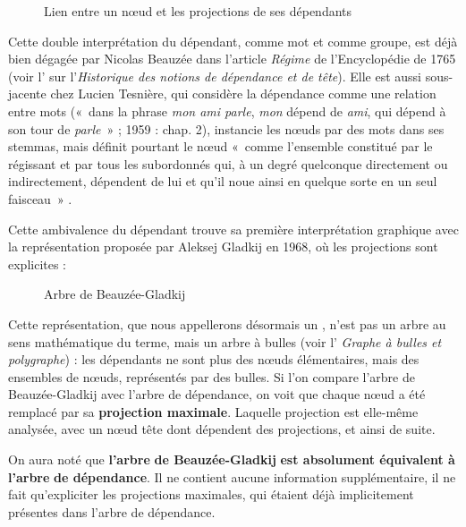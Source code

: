 \begin{figure}

\caption{\label{fig:}Lien entre un nœud et les projections de ses dépendants}

\end{figure}

Cette double interprétation du dépendant, comme mot et comme groupe, est déjà bien dégagée par Nicolas Beauzée dans l’article \textit{Régime} de l’Encyclopédie de 1765 (voir l’ sur l’\textit{Historique des notions de dépendance et de tête}). Elle est aussi sous-jacente chez Lucien Tesnière, qui considère la dépendance comme une relation entre mots («~dans la phrase \textit{mon ami parle}, \textit{mon} dépend de \textit{ami}, qui dépend à son tour de \textit{parle}~» ; 1959 : chap. 2), instancie les nœuds par des mots dans ses stemmas, mais définit pourtant le nœud «~comme l’ensemble constitué par le régissant et par tous les subordonnés qui, à un degré quelconque directement ou indirectement, dépendent de lui et qu’il noue ainsi en quelque sorte en un seul faisceau~» \citep[chap.3]{Tesnières1959}.

Cette ambivalence du dépendant trouve sa première interprétation graphique avec la représentation proposée par Aleksej Gladkij en 1968, où les projections sont explicites :

\begin{figure}

\caption{\label{fig:}Arbre de Beauzée-Gladkij}

\end{figure}

Cette représentation, que nous appellerons désormais un , n’est pas un arbre au sens mathématique du terme, mais un arbre à bulles (voir l’ \textit{Graphe à bulles et polygraphe}) : les dépendants ne sont plus des nœuds élémentaires, mais des ensembles de nœuds, représentés par des bulles. Si l’on compare l’arbre de Beauzée-Gladkij avec l’arbre de dépendance, on voit que chaque nœud a été remplacé par sa \textbf{projection maximale}. Laquelle projection est elle-même analysée, avec un nœud tête dont dépendent des projections, et ainsi de suite.

On aura noté que \textbf{l’arbre} \textbf{de Beauzée-Gladkij} \textbf{est absolument équivalent à l’arbre} \textbf{de dépendance}. Il ne contient aucune information supplémentaire, il ne fait qu’expliciter les projections maximales, qui étaient déjà implicitement présentes dans l’arbre de dépendance.

